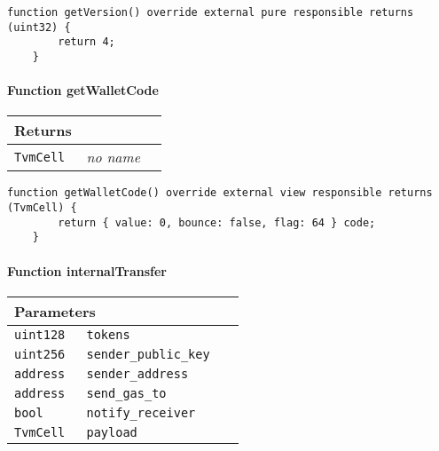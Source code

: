 \vspace{2cm}

\begin{lstlisting}[firstnumber=54]
    function getVersion() override external pure responsible returns (uint32) {
        return 4;
    }
\end{lstlisting}

\paragraph{Function getWalletCode}


\ifsoltables
\noindent\begin{tabular}{|l|l|p{5cm}|}\hline
\multicolumn{3}{|l|}{\bf Returns}\\\hline
\tt TvmCell & {\em no name} &\\\hline
\end{tabular}
\fi

\vspace{2cm}

\begin{lstlisting}[firstnumber=87]
    function getWalletCode() override external view responsible returns (TvmCell) {
        return { value: 0, bounce: false, flag: 64 } code;
    }
\end{lstlisting}

\paragraph{Function internalTransfer}


\ifsoltables
\noindent\begin{tabular}{|l|l|p{5cm}|}\hline
\multicolumn{3}{|l|}{\bf Parameters}\\\hline
\tt uint128 & \tt tokens &\\\hline
\tt uint256 & \tt sender\_{}public\_{}key &\\\hline
\tt address & \tt sender\_{}address &\\\hline
\tt address & \tt send\_{}gas\_{}to &\\\hline
\tt bool & \tt notify\_{}receiver &\\\hline
\tt TvmCell & \tt payload &\\\hline
\end{tabular}
\fi

\vspace{2cm}

